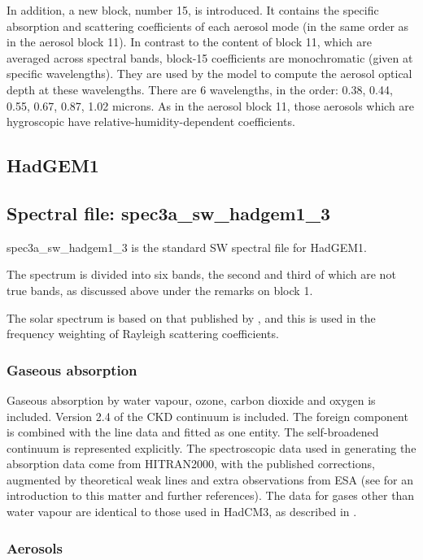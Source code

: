 In addition, a new block, number 15, is introduced. It contains the specific absorption and scattering coefficients of each aerosol mode (in the same order as in the aerosol block 11). In contrast to the content of block 11, which are averaged across spectral bands, block-15 coefficients are monochromatic (given at specific wavelengths). They are used by the model to compute the aerosol optical depth at these wavelengths. There are 6 wavelengths, in the order: 0.38, 0.44, 0.55, 0.67, 0.87, 1.02 microns. As in the aerosol block 11, those aerosols which are hygroscopic have relative-humidity-dependent coefficients. 

\subsection{HadGEM1}

\subsection*{Spectral file: spec3a\_sw\_hadgem1\_3}

spec3a\_sw\_hadgem1\_3 is the standard SW spectral file
for HadGEM1.

The spectrum is divided into six bands, the
second and third of which are not true bands, as discussed above
under the remarks on block 1.

The solar spectrum is based on that published by \citet{Kurucz95}, and
this is used in the frequency weighting of Rayleigh scattering 
coefficients.

\subsubsection*{Gaseous absorption}

Gaseous absorption by water vapour, ozone, carbon dioxide and oxygen 
is included. Version 2.4 of the CKD continuum is included. The
foreign component is combined with the line data and fitted as one
entity. The self-broadened continuum is represented explicitly.
The spectroscopic data used in generating the absorption data come from 
HITRAN2000, with the published corrections, augmented by theoretical 
weak lines and extra observations from ESA (see \citet{Zhong2001}
for an introduction to this matter and further references). 
The data for gases other than water vapour are identical to those
used in HadCM3, as described in \citet{Cusack99ck}.

\subsubsection*{Aerosols}

